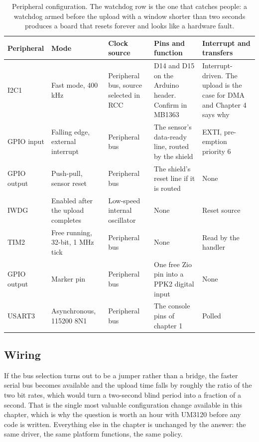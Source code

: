 \begin{table}[H]\centering\small
\begin{tabular}{p{22mm}p{26mm}p{24mm}p{30mm}p{30mm}}
\toprule
Peripheral & Mode & Clock source & Pins and function & Interrupt and transfers \\
\midrule
I2C1 & Fast mode, 400 kHz & Peripheral bus, source selected in RCC & D14 and D15 on the Arduino header. Confirm in MB1363 & Interrupt-driven. The upload is the case for DMA and Chapter 4 says why \\
GPIO input & Falling edge, external interrupt & Peripheral bus & The sensor's data-ready line, routed by the shield & EXTI, pre-emption priority 6 \\
GPIO output & Push-pull, sensor reset & Peripheral bus & The shield's reset line if it is routed & None \\
IWDG & Enabled after the upload completes & Low-speed internal oscillator & None & Reset source \\
TIM2 & Free running, 32-bit, 1 MHz tick & Peripheral bus & None & Read by the handler \\
GPIO output & Marker pin & Peripheral bus & One free Zio pin into a PPK2 digital input & None \\
USART3 & Asynchronous, 115200 8N1 & Peripheral bus & The console pins of chapter 1 & Polled \\
\bottomrule
\end{tabular}
\caption{Peripheral configuration. The watchdog row is the one that catches people: a watchdog armed before the upload with a window shorter than two seconds produces a board that resets forever and looks like a hardware fault.}
\end{table}

\subsection*{Wiring}


If the bus selection turns out to be a jumper rather than a bridge, the faster
serial bus becomes available and the upload time falls by roughly the ratio of
the two bit rates, which would turn a two-second blind period into a fraction of
a second. That is the single most valuable configuration change available in
this chapter, which is why the question is worth an hour with UM3120 before any
code is written. Everything else in the chapter is unchanged by the answer: the
same driver, the same platform functions, the same policy.

